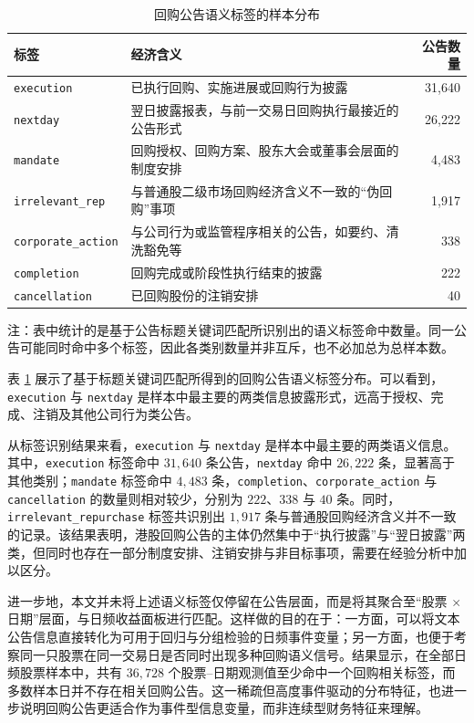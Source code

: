 \documentclass[a4paper,10pt]{article}
\begin{document}
\begin{table}[H]
\centering
\caption{回购公告语义标签的样本分布}
\label{tab:event_tag_distribution}
\begin{tabular}{p{3cm} p{7cm} r}
\toprule
\textbf{标签} & \textbf{经济含义} & \textbf{公告数量} \\
\midrule
\texttt{execution} & 已执行回购、实施进展或回购行为披露 & 31,640 \\
\texttt{nextday} & 翌日披露报表，与前一交易日回购执行最接近的公告形式 & 26,222 \\
\texttt{mandate} & 回购授权、回购方案、股东大会或董事会层面的制度安排 & 4,483 \\
\texttt{irrelevant\_rep} & 与普通股二级市场回购经济含义不一致的“伪回购”事项 & 1,917 \\
\texttt{corporate\_action} & 与公司行为或监管程序相关的公告，如要约、清洗豁免等 & 338 \\
\texttt{completion} & 回购完成或阶段性执行结束的披露 & 222 \\
\texttt{cancellation} & 已回购股份的注销安排 & 40 \\
\bottomrule
\end{tabular}
\begin{tablenotes}
\small
\item 注：表中统计的是基于公告标题关键词匹配所识别出的语义标签命中数量。同一公告可能同时命中多个标签，因此各类别数量并非互斥，也不必加总为总样本数。
\end{tablenotes}
\end{table}

表 \ref{tab:event_tag_distribution} 展示了基于标题关键词匹配所得到的回购公告语义标签分布。可以看到，\texttt{execution} 与 \texttt{nextday} 是样本中最主要的两类信息披露形式，远高于授权、完成、注销及其他公司行为类公告。

从标签识别结果来看，\texttt{execution} 与 \texttt{nextday} 是样本中最主要的两类语义信息。其中，\texttt{execution} 标签命中 \(31{,}640\) 条公告，\texttt{nextday} 命中 \(26{,}222\) 条，显著高于其他类别；\texttt{mandate} 标签命中 \(4{,}483\) 条，\texttt{completion}、\texttt{corporate\_action} 与 \texttt{cancellation} 的数量则相对较少，分别为 \(222\)、\(338\) 与 \(40\) 条。同时，\texttt{irrelevant\_repurchase} 标签共识别出 \(1{,}917\) 条与普通股回购经济含义并不一致的记录。该结果表明，港股回购公告的主体仍然集中于“执行披露”与“翌日披露”两类，但同时也存在一部分制度安排、注销安排与非目标事项，需要在经验分析中加以区分。

进一步地，本文并未将上述语义标签仅停留在公告层面，而是将其聚合至“股票 $\times$ 日期”层面，与日频收益面板进行匹配。这样做的目的在于：一方面，可以将文本公告信息直接转化为可用于回归与分组检验的日频事件变量；另一方面，也便于考察同一只股票在同一交易日是否同时出现多种回购语义信号。结果显示，在全部日频股票样本中，共有 \(36{,}728\) 个股票--日期观测值至少命中一个回购相关标签，而多数样本日并不存在相关回购公告。这一稀疏但高度事件驱动的分布特征，也进一步说明回购公告更适合作为事件型信息变量，而非连续型财务特征来理解。
\end{document}
